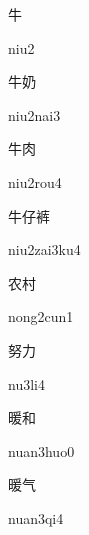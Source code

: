 \begin{verbete}[niu2]{牛}
\begin{pronuncia}{niu2}
\end{pronuncia}
\end{verbete}

\begin{verbete}{牛奶}
\begin{pronuncia}{niu2nai3}
\end{pronuncia}
\end{verbete}

\begin{verbete}{牛肉}
\begin{pronuncia}{niu2rou4}
\end{pronuncia}
\end{verbete}

\begin{verbete}{牛仔裤}
\begin{pronuncia}{niu2zai3ku4}
\end{pronuncia}
\end{verbete}

\begin{verbete}{农村}
\begin{pronuncia}{nong2cun1}
\end{pronuncia}
\end{verbete}

\begin{verbete}[nu3li4]{努力}
\begin{pronuncia}{nu3li4}
\end{pronuncia}
\end{verbete}

\begin{verbete}{暖和}
\begin{pronuncia}{nuan3huo0}
\end{pronuncia}
\end{verbete}

\begin{verbete}[nuan3qi4]{暖气}
\begin{pronuncia}{nuan3qi4}
\end{pronuncia}
\end{verbete}


